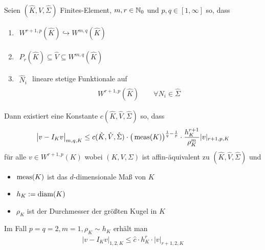 \begin{theorem}\label{theorem4.14}
	Seien $(\hat{K},\hat{V},\hat{\Sigma})$ Finites-Element, $m,r\in\mathbb{N}_0$ und $p,q\in[1,\infty]$ so, dass
	\begin{enumerate}[label=(\roman*)]
		\item $\begin{aligned}
			W^{r+1,p}(\hat{K})\hookrightarrow W^{m,q}(\hat{K})
		\end{aligned}$
		\item $\begin{aligned}
			P_r(\hat{K})\subseteq\hat{V}\subseteq W^{m,q}(\hat{K})
		\end{aligned}$
		\item $\begin{aligned}
			\hat{N}_i
		\end{aligned}$ lineare stetige Funktionale auf
		\begin{align*}
			W^{r+1,p}(\hat{K})\qquad\forall\hat{N}_i\in\hat{\Sigma}
		\end{align*}
	\end{enumerate}
	Dann existiert eine Konstante $c(\hat{K},\hat{V},\hat{\Sigma})$ so, dass
	\begin{align*}
		\big| v-I_K v\big|_{m,q,K}\leq c(\hat{K},\hat{V},\hat{\Sigma})\cdot\big(\operatorname{meas}(K)\big)^{\frac{1}{q}-\frac{1}{p}}\cdot\frac{h_K^{r+1}}{\rho_K^m}|v|_{r+1,p,K}
	\end{align*}
	für alle $v\in W^{r+1,p}(K)$ wobei $(K,V,\Sigma	)$ ist affin-äquivalent zu $(\hat{K},\hat{V},\hat{\Sigma})$ und
	\begin{itemize}
		\item $\operatorname{meas}(K)$ ist das $d$-dimensionale Maß von $K$
		\item $h_K:=\operatorname{diam}(K)$
		\item $\rho_K$ ist der Durchmesser der größten Kugel in $K$
	\end{itemize}
	Im Fall $p=q=2,m=1,\rho_K\sim h_K$ erhält man
	\begin{align*}
		\big|v-I_K v\big|_{1,2,K}\leq \hat{c}\cdot h_K^r\cdot |v|_{r+1,2,K}
	\end{align*}
\end{theorem}

